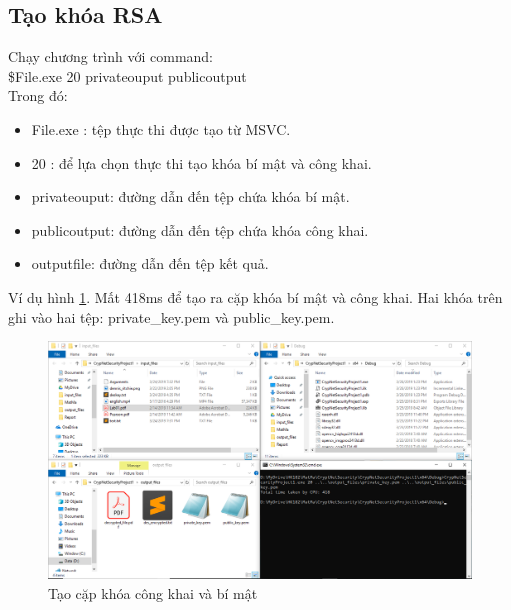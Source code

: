 \documentclass[a4paper]{article}
\begin{document}
    \subsection{Tạo khóa RSA}
    Chạy chương trình với command:\\
    \$File.exe 20  privateouput publicoutput\\
    Trong đó:
    \begin{itemize}
        \item File.exe : tệp thực thi được tạo từ MSVC.
        \item 20 : để lựa chọn thực thi tạo khóa bí mật và công khai.
        \item privateouput: đường dẫn đến tệp chứa khóa bí mật.
        \item publicoutput: đường dẫn đến tệp chứa khóa công khai.
        \item outputfile: đường dẫn đến tệp kết quả. 
    \end{itemize}
    Ví dụ hình \ref{fig:rsacreate}. Mất 418ms để tạo ra cặp khóa bí mật và công khai. Hai khóa trên ghi vào hai tệp: private\_key.pem và  public\_key.pem.
    \begin{figure}[htp]
        \centering
        \includegraphics[scale=0.4]{rsacreate.png}
        \caption{Tạo cặp khóa công khai và bí mật}
        \label{fig:rsacreate}
    \end{figure}
\end{document}
